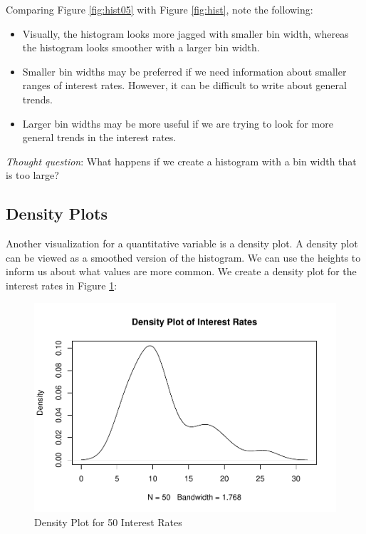 \documentclass[
]{book}
\newenvironment{Shaded}{\begin{snugshade}}{\end{snugshade}}
\newcommand{\AttributeTok}[1]{\textcolor[rgb]{0.13,0.29,0.53}{#1}}
\newcommand{\DocumentationTok}[1]{\textcolor[rgb]{0.56,0.35,0.01}{\textbf{\textit{#1}}}}
\newcommand{\FunctionTok}[1]{\textcolor[rgb]{0.13,0.29,0.53}{\textbf{#1}}}
\newcommand{\NormalTok}[1]{#1}
\newcommand{\SpecialCharTok}[1]{\textcolor[rgb]{0.81,0.36,0.00}{\textbf{#1}}}
\newcommand{\StringTok}[1]{\textcolor[rgb]{0.31,0.60,0.02}{#1}}
\begin{document}
Comparing Figure \ref{fig:hist05} with Figure \ref{fig:hist}, note the following:

\begin{itemize}
\item
  Visually, the histogram looks more jagged with smaller bin width, whereas the histogram looks smoother with a larger bin width.
\item
  Smaller bin widths may be preferred if we need information about smaller ranges of interest rates. However, it can be difficult to write about general trends.
\item
  Larger bin widths may be more useful if we are trying to look for more general trends in the interest rates.
\end{itemize}

\emph{Thought question}: What happens if we create a histogram with a bin width that is too large?

\subsection{Density Plots}\label{density-plots}

Another visualization for a quantitative variable is a density plot. A density plot can be viewed as a smoothed version of the histogram. We can use the heights to inform us about what values are more common. We create a density plot for the interest rates in Figure \ref{fig:dens}:

\begin{Shaded}
\end{Shaded}

\begin{figure}
\centering
\includegraphics{bookdown-demo_files/figure-latex/dens-1.pdf}
\caption{\label{fig:dens}Density Plot for 50 Interest Rates}
\end{figure}
\end{document}
